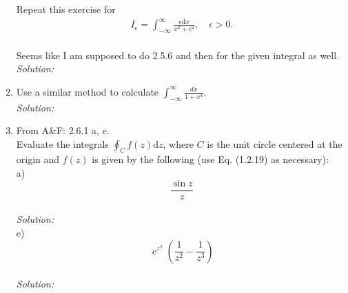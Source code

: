 \documentclass[10pt]{amsart}
\newcommand{\D}{\mathrm{d}}
\DeclareMathOperator{\E}{e}
\theoremstyle{nonumberplain}
\begin{document}
\begin{enumerate}[label={\bf {\arabic*}:}]
\noindent
Repeat this exercise for
  \begin{align*}
    I_\epsilon = \int_{-\infty}^\infty \frac{\epsilon \D x}{x^2 +
    \epsilon^2}, \quad \epsilon > 0.
  \end{align*}\\
Seems like I am supposed to do 2.5.6 and then for the given integral as well. \\
\textit{Solution:}\\
\item Use a similar method to calculate
  $\int_{-\infty}^{\infty} \frac{d x}{1+x^4}$. \\
\textit{Solution:}\\

\item From A\&F: 2.6.1 a, e.\\
Evaluate the integrals $\oint_C f(z) \D z$, where $C$ is the unit circle centered at the origin and $f(z)$ is given by the following (use Eq. (1.2.19) as necessary): \\
a)
$$
\frac{\sin z}{z}
$$
\\
\textit{Solution:}\\
e)
$$
\E^{z^2}\left(\frac{1}{z^2} - \frac{1}{z^3}\right)
$$
\\
\textit{Solution:}\\
\end{enumerate}
\end{document}

